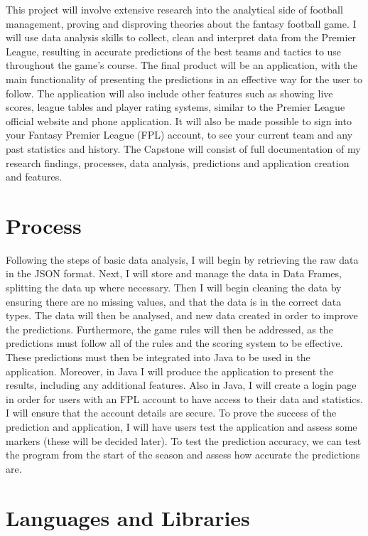 \documentclass[12pt, a4paper,oneside]{book}
\numberwithin{equation}{section}
\begin{document}
This project will involve extensive research into the analytical side of football management,
proving and disproving theories about the fantasy football game. I will use data analysis
skills to collect, clean and interpret data from the Premier League, resulting in accurate
predictions of the best teams and tactics to use throughout the game's course. The final
product will be an application, with the main functionality of presenting the predictions in an
effective way for the user to follow. The application will also include other features such as
showing live scores, league tables and player rating systems, similar to the Premier League
official website and phone application. It will also be made possible to sign into your Fantasy
Premier League (FPL) account, to see your current team and any past statistics and history.
The Capstone will consist of full documentation of my research findings, processes, data
analysis, predictions and application creation and features.

\section{Process}\label{sec:1.2}

Following the steps of basic data analysis, I will begin by retrieving the raw data in the JSON
format. Next, I will store and manage the data in Data Frames, splitting the data up where
necessary. Then I will begin cleaning the data by ensuring there are no missing values, and
that the data is in the correct data types. The data will then be analysed, and new data created
in order to improve the predictions. Furthermore, the game rules will then be addressed,
as the predictions must follow all of the rules and the scoring system to be effective. These
predictions must then be integrated into Java to be used in the application. Moreover, in Java
I will produce the application to present the results, including any additional features. Also
in Java, I will create a login page in order for users with an FPL account to have access to their
data and statistics. I will ensure that the account details are secure. To prove the success of
the prediction and application, I will have users test the application and assess some markers
(these will be decided later). To test the prediction accuracy, we can test the program from
the start of the season and assess how accurate the predictions are.

\section{Languages and Libraries}\label{sec:1.3}
\end{document}
